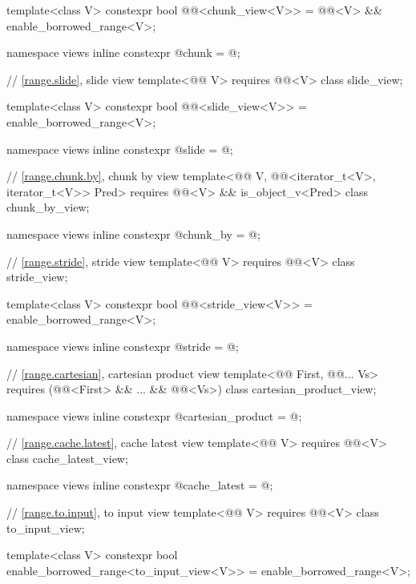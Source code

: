 \begin{codeblock}
{  template<class V>
    constexpr bool @@<chunk_view<V>> =
      @@<V> && enable_borrowed_range<V>;

  namespace views { inline constexpr @\unspecnc@ chunk = @\unspecnc@; }

  // \ref{range.slide}, slide view
  template<@@ V>
    requires @@<V>
  class slide_view;

  template<class V>
    constexpr bool @@<slide_view<V>> =
      enable_borrowed_range<V>;

  namespace views { inline constexpr @\unspecnc@ slide = @\unspecnc@; }

  // \ref{range.chunk.by}, chunk by view
  template<@@ V, @@<iterator_t<V>, iterator_t<V>> Pred>
    requires @@<V> && is_object_v<Pred>
  class chunk_by_view;

  namespace views { inline constexpr @\unspecnc@ chunk_by = @\unspecnc@; }

  // \ref{range.stride}, stride view
  template<@@ V>
    requires @@<V>
  class stride_view;

  template<class V>
    constexpr bool @@<stride_view<V>> =
      enable_borrowed_range<V>;

  namespace views { inline constexpr @\unspecnc@ stride = @\unspecnc@; }

  // \ref{range.cartesian}, cartesian product view
  template<@@ First, @@... Vs>
    requires (@@<First> && ... && @@<Vs>)
  class cartesian_product_view;

  namespace views { inline constexpr @\unspecnc@ cartesian_product = @\unspecnc@; }

  // \ref{range.cache.latest}, cache latest view
  template<@@ V>
    requires @@<V>
  class cache_latest_view;

  namespace views { inline constexpr @\unspec@ cache_latest = @\unspec@; }

  // \ref{range.to.input}, to input view
  template<@@ V>
    requires @@<V>
  class to_input_view;

  template<class V>
    constexpr bool enable_borrowed_range<to_input_view<V>> =
      enable_borrowed_range<V>;

}
\end{codeblock}
